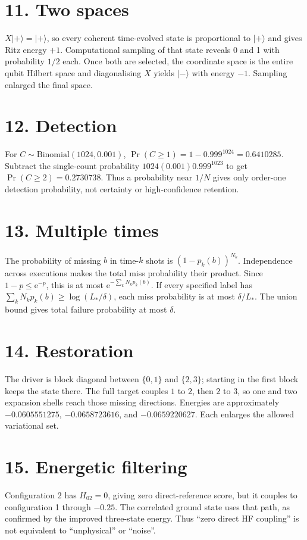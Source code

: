 \documentclass[11pt,a4paper,oneside]{report}
\newcommand{\ket}[1]{\lvert #1\rangle}
\newcommand{\e}{\mathrm e}
\begin{document}
\section*{11. Two spaces}
$X\ket+=\ket+$, so every coherent time-evolved state is proportional to $\ket+$ and gives Ritz energy $+1$. Computational sampling of that state reveals 0 and 1 with probability $1/2$ each. Once both are selected, the coordinate space is the entire qubit Hilbert space and diagonalising $X$ yields $\ket-$ with energy $-1$. Sampling enlarged the final space.

\section*{12. Detection}
For $C\sim\mathrm{Binomial}(1024,0.001)$, $\Pr(C\ge1)=1-0.999^{1024}=0.6410285$. Subtract the single-count probability $1024(0.001)0.999^{1023}$ to get $\Pr(C\ge2)=0.2730738$. Thus a probability near $1/N$ gives only order-one detection probability, not certainty or high-confidence retention.

\section*{13. Multiple times}
The probability of missing $b$ in time-$k$ shots is $(1-p_k(b))^{N_k}$. Independence across executions makes the total miss probability their product. Since $1-p\le\e^{-p}$, this is at most $\e^{-\sum_kN_kp_k(b)}$. If every specified label has $\sum_kN_kp_k(b)\ge\log(L_*/\delta)$, each miss probability is at most $\delta/L_*$. The union bound gives total failure probability at most $\delta$.

\section*{14. Restoration}
The driver is block diagonal between $\{0,1\}$ and $\{2,3\}$; starting in the first block keeps the state there. The full target couples $1$ to $2$, then $2$ to $3$, so one and two expansion shells reach those missing directions. Energies are approximately $-0.0605551275$, $-0.0658723616$, and $-0.0659220627$. Each enlarges the allowed variational set.

\section*{15. Energetic filtering}
Configuration 2 has $H_{02}=0$, giving zero direct-reference score, but it couples to configuration 1 through $-0.25$. The correlated ground state uses that path, as confirmed by the improved three-state energy. Thus ``zero direct HF coupling'' is not equivalent to ``unphysical'' or ``noise''.
\end{document}
